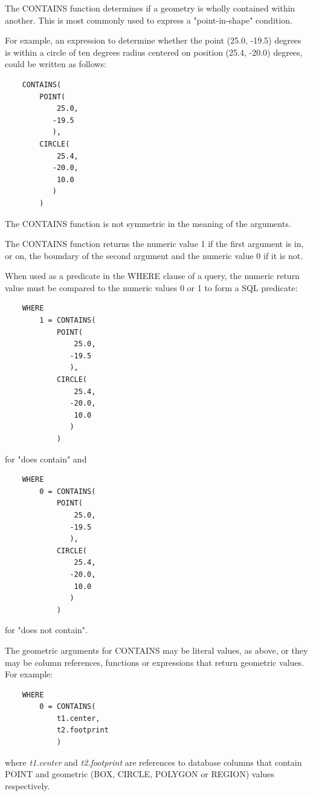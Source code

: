 \documentclass[11pt,a4paper]{ivoa}
\begin{document}
The CONTAINS function determines if a geometry is wholly contained within
another. This is most commonly used to express a "point-in-shape" condition.

For example, an expression to determine whether the point (25.0, -19.5) degrees
is within a circle of ten degrees radius centered on position (25.4, -20.0) degrees,
could be written as follows:
\begin{verbatim}
    CONTAINS(
        POINT(
            25.0,
           -19.5
           ),
        CIRCLE(
            25.4,
           -20.0,
            10.0
           )
        )
\end{verbatim}

The CONTAINS function is not symmetric in the meaning of the arguments.

The CONTAINS function returns the numeric value 1 if the first argument
is in, or on, the boundary of the second argument and the numeric value 0
if it is not.

When used as a predicate in the WHERE clause of a query, the numeric return
value must be compared to the numeric values 0 or 1 to form a SQL predicate:
\begin{verbatim}
    WHERE
        1 = CONTAINS(
            POINT(
                25.0,
               -19.5
               ),
            CIRCLE(
                25.4,
               -20.0,
                10.0
               )
            )
\end{verbatim}
\noindent
for "does contain" and
\begin{verbatim}
    WHERE
        0 = CONTAINS(
            POINT(
                25.0,
               -19.5
               ),
            CIRCLE(
                25.4,
               -20.0,
                10.0
               )
            )
\end{verbatim}
\noindent
for "does not contain".


The geometric arguments for CONTAINS may be literal values, as above,
or they may be column references, functions or expressions that return
geometric values.
For example:
\begin{verbatim}
    WHERE
        0 = CONTAINS(
            t1.center,
            t2.footprint
            )
\end{verbatim}
where \textit{t1.center} and \textit{t2.footprint} are references to
database columns that contain POINT and geometric (BOX, CIRCLE, POLYGON or REGION)
values respectively.
\end{document}
